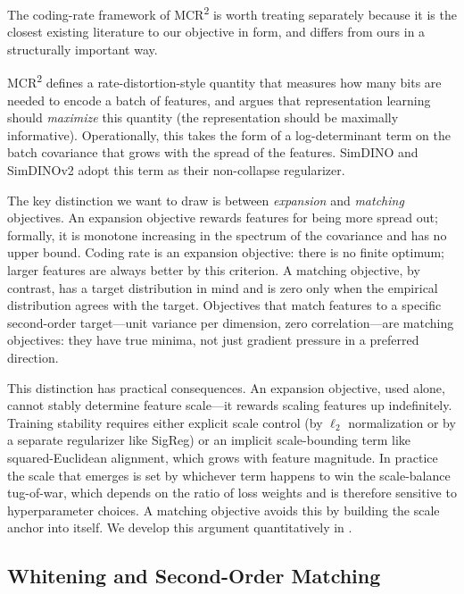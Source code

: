 The coding-rate framework of MCR\textsuperscript{2} \citep{yu2020mcr2} is worth treating separately because it is the closest existing literature to our objective in form, and differs from ours in a structurally important way.

MCR\textsuperscript{2} defines a rate-distortion-style quantity that measures how many bits are needed to encode a batch of features, and argues that representation learning should \emph{maximize} this quantity (the representation should be maximally informative). Operationally, this takes the form of a log-determinant term on the batch covariance that grows with the spread of the features. SimDINO and SimDINOv2 adopt this term as their non-collapse regularizer.

The key distinction we want to draw is between \emph{expansion} and \emph{matching} objectives. An expansion objective rewards features for being more spread out; formally, it is monotone increasing in the spectrum of the covariance and has no upper bound. Coding rate is an expansion objective: there is no finite optimum; larger features are always better by this criterion. A matching objective, by contrast, has a target distribution in mind and is zero only when the empirical distribution agrees with the target. Objectives that match features to a specific second-order target---unit variance per dimension, zero correlation---are matching objectives: they have true minima, not just gradient pressure in a preferred direction.

This distinction has practical consequences. An expansion objective, used alone, cannot stably determine feature scale---it rewards scaling features up indefinitely. Training stability requires either explicit scale control (by $\ell_2$ normalization or by a separate regularizer like SigReg) or an implicit scale-bounding term like squared-Euclidean alignment, which grows with feature magnitude. In practice the scale that emerges is set by whichever term happens to win the scale-balance tug-of-war, which depends on the ratio of loss weights and is therefore sensitive to hyperparameter choices. A matching objective avoids this by building the scale anchor into itself. We develop this argument quantitatively in .

\subsection{Whitening and Second-Order Matching}

